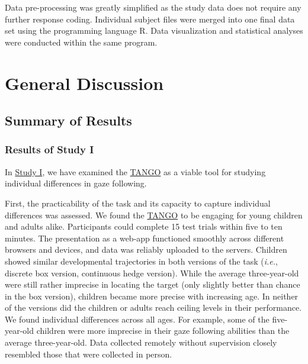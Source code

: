 \documentclass[
]{scrbook}
\begin{document}
Data pre-processing was greatly simplified as the study data does not require any further response coding. Individual subject files were merged into one final data set using the programming language R. Data visualization and statistical analyses were conducted within the same program.

\chapter{General Discussion}\label{discussion}

\section{Summary of Results}\label{summary-of-results}

\subsection{Results of Study I}\label{resultsI}

In \hyperref[studyI]{Study I}, we have examined the \hyperref[acronyms_TANGO]{TANGO} as a viable tool for studying individual differences in gaze following.

First, the practicability of the task and its capacity to capture individual differences was assessed. We found the \hyperref[acronyms_TANGO]{TANGO} to be engaging for young children and adults alike. Participants could complete 15 test trials within five to ten minutes. The presentation as a web-app functioned smoothly across different browsers and devices, and data was reliably uploaded to the servers. Children showed similar developmental trajectories in both versions of the task (\emph{i.e.}, discrete box version, continuous hedge version). While the average three-year-old were still rather imprecise in locating the target (only slightly better than chance in the box version), children became more precise with increasing age. In neither of the versions did the children or adults reach ceiling levels in their performance. We found individual differences across all ages. For example, some of the five-year-old children were more imprecise in their gaze following abilities than the average three-year-old. Data collected remotely without supervision closely resembled those that were collected in person.
\end{document}
